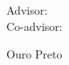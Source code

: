 \begin{titlepage}
\centering
{\Large \ThesisInstitution\\}
\vspace{0.5cm}
{\large \ThesisProgram\\}
\vfill
{\Large \ThesisAuthor\\}
\vfill
{\bfseries\LARGE \ThesisTitle\\}
\vfill
\begin{flushright}
Advisor: \ThesisAdvisor\\
Co-advisor: \ThesisCoAdvisor
\end{flushright}
\vfill
{Ouro Preto\\\ThesisYear}
\end{titlepage}
